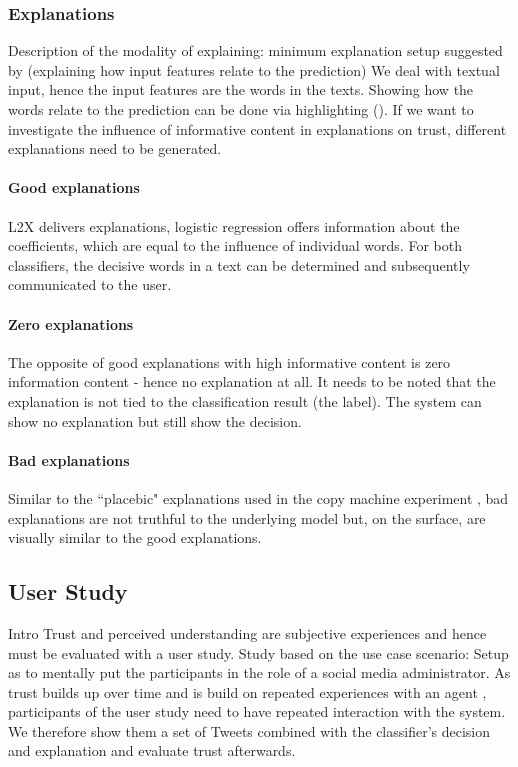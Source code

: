 \subsubsection{Explanations}
Description of the modality of explaining:\newline
minimum explanation setup suggested by \cite{goodman16eu} (explaining how input features relate to the prediction)\newline
We deal with textual input, hence the input features are the words in the texts. Showing how the words relate to the prediction can be done via highlighting (\cite{arras2017relevant, chen2012detecting, feng2018pathologies}).\newline
If we want to investigate the influence of informative content in explanations on trust, different explanations need to be generated.
\paragraph{Good explanations}
L2X delivers explanations, logistic regression offers information about the coefficients, which are equal to the influence of individual words. For both classifiers, the decisive words in a text can be determined and subsequently communicated to the user.
\paragraph{Zero explanations}
The opposite of good explanations with high informative content is zero information content - hence no explanation at all. It needs to be noted that the explanation is not tied to the classification result (the label). The system can show no explanation but still show the decision. 
\paragraph{Bad explanations}
Similar to the ``placebic" explanations used in the copy machine experiment \cite{langer1978mindlessness}, bad explanations are not truthful to the underlying model but, on the surface, are visually similar to the good explanations.  




\subsection{User Study}
Intro\newline
Trust and perceived understanding are subjective experiences and hence must be evaluated with a user study. Study based on the use case scenario: Setup as to mentally put the participants in the role of a social media administrator.\newline
As trust builds up over time and is build on repeated experiences with an agent \cite{rempel1985trust}, participants of the user study need to have repeated interaction with the system. We therefore show them a set of Tweets combined with the classifier's decision and explanation and evaluate trust afterwards.\newline


